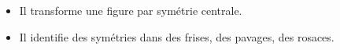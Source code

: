 \begin{changemargin}{-10mm}{-10mm}
\begin{prerequis}[Objectifs de 5\up{e}]  
    \begin{itemize}  
        \item Il transforme une figure par symétrie centrale.
        \columnbreak
        \item Il identifie des symétries dans des frises, des pavages, des rosaces.
    \end{itemize}
\end{prerequis}
\end{changemargin}